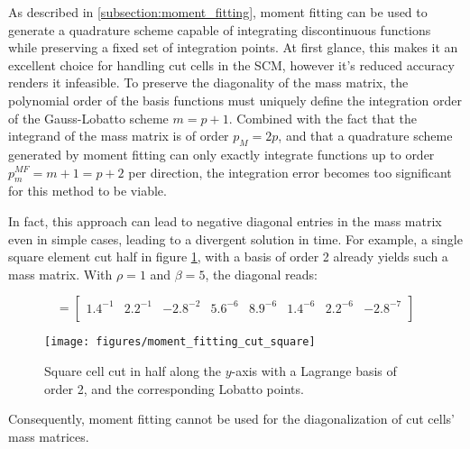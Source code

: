 As described in \ref{subsection:moment_fitting}, moment fitting can be used to generate a quadrature scheme capable of integrating discontinuous functions while preserving a fixed set of integration points. At first glance, this makes it an excellent choice for handling cut cells in the SCM, however it's reduced accuracy renders it infeasible. To preserve the diagonality of the mass matrix, the polynomial order of the basis functions must uniquely define the integration order of the Gauss-Lobatto scheme $m=p+1$. Combined with the fact that the integrand of the mass matrix is of order $p_M=2p$, and that a quadrature scheme generated by moment fitting can only exactly integrate functions up to order $p_m^{MF}=m+1=p+2$ per direction, the integration error becomes too significant for this method to be viable.

In fact, this approach can lead to negative diagonal entries in the mass matrix even in simple cases, leading to a divergent solution in time. For example, a single square element cut half in figure \ref{fig:moment_fitting_cut_square}, with a basis of order 2 already yields such a mass matrix. With $\rho=1$ and $\beta=5$, the diagonal reads:

\begin{equation}
		[M_{ii}^e] =
		\begin{bmatrix}
			1.4^{-1} &
			2.2^{-1} &
			-2.8^{-2} &
			5.6^{-6} &
			8.9^{-6} &
			1.4^{-6} &
			2.2^{-6} &
			-2.8^{-7} \\
		\end{bmatrix}
\end{equation}

\begin{figure}[h]
	\centering
	\texttt{[image: figures/moment\_fitting\_cut\_square]}
	\caption{Square cell cut in half along the $y$-axis with a Lagrange basis of order 2, and the corresponding Lobatto points.}
	\label{fig:moment_fitting_cut_square}
\end{figure}

Consequently, moment fitting cannot be used for the diagonalization of cut cells' mass matrices.